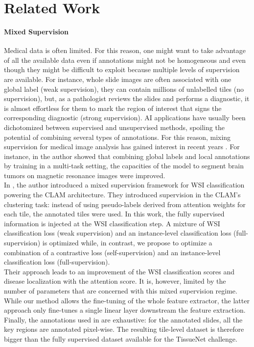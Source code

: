 \section{Related Work}

\paragraph{Mixed Supervision}

Medical data is often limited. For this reason, one might want to take advantage of all the available data even if annotations might not be homogeneous and even though they might be difficult to exploit because multiple levels of supervision are available. For instance, whole slide images are often associated with one global label (weak supervision), they can contain millions of unlabelled tiles (no supervision), but, as a pathologist reviews the slides and performs a diagnostic, it is almost effortless for them to mark the region of interest that signs the corresponding diagnostic (strong supervision). AI applications have usually been dichotomized between supervised and unsupervised methods, spoiling the potential of combining several types of annotations. For this reason, mixing supervision for medical image analysis  has gained interest in recent years \citep{huang_rectifying_2020, li_thoracic_2018, li_hybrid_2021}.
For instance, in \citep{mlynarski_deep_2019} the author showed that combining global labels and local annotations by training in a multi-task setting, the capacities of the model to segment brain tumors on magnetic resonance images were improved.  \\
In \citep{tourniaire_attention-based_2021}, the author introduced a mixed supervision framework for WSI classification powering the CLAM \citep{lu_data-efficient_2021} architecture. They introduced supervision in the CLAM’s clustering task: instead of using pseudo-labels derived from attention weights for each tile, the annotated tiles were used.  In this work, the fully supervised information is injected at the WSI classification step. A mixture of WSI classification loss (weak supervision) and an instance-level classification loss (full-supervision) is optimized while, in contrast, we propose to optimize a combination of a contrastive loss (self-supervision) and an instance-level classification loss (full-supervision). \\
Their approach leads to an improvement of the WSI classification scores and disease localization with the attention score. It is, however, limited by the number of parameters that are concerned with this mixed supervision regime. While our method allows the fine-tuning of the whole feature extractor, the latter approach only fine-tunes a single linear layer downstream the feature extraction. Finally, the annotations used in \citep{tourniaire_attention-based_2021} are exhaustive: for the annotated slides, all the key regions are annotated pixel-wise. The resulting tile-level dataset is therefore bigger than the fully supervised dataset available for the TissueNet challenge.